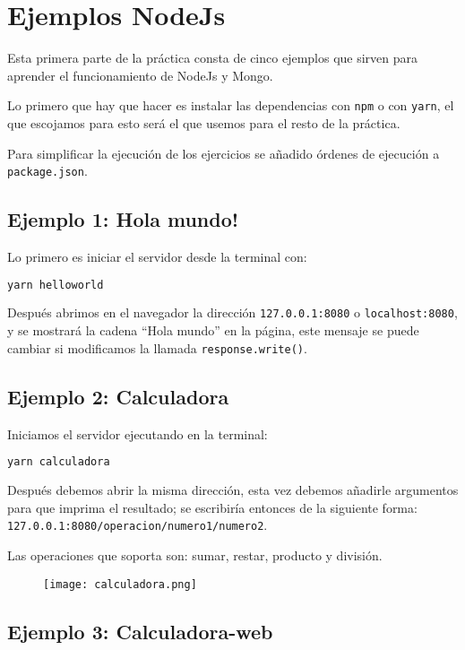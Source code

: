 \chapter{Ejemplos NodeJs}

Esta primera parte de la práctica consta de cinco ejemplos que sirven para aprender
el funcionamiento de NodeJs y Mongo.

Lo primero que hay que hacer es instalar las dependencias con \texttt{npm} o con \texttt{yarn},
el que escojamos para esto será el que usemos para el resto de la práctica.

Para simplificar la ejecución de los ejercicios se añadido órdenes de ejecución a
\texttt{package.json}.

\section{Ejemplo 1: Hola mundo!}
Lo primero es iniciar el servidor desde la terminal con:
\begin{lstlisting}[language=sh]
	yarn helloworld
\end{lstlisting}

Después abrimos en el navegador la dirección \texttt{127.0.0.1:8080} o \texttt{localhost:8080},
y se mostrará la cadena ``Hola mundo'' en la página, este mensaje se puede cambiar si modificamos
la llamada \texttt{response.write()}.

\section{Ejemplo 2: Calculadora}
Iniciamos el servidor ejecutando en la terminal:
\begin{lstlisting}[language=sh]
	yarn calculadora
\end{lstlisting}

Después debemos abrir la misma dirección, esta vez debemos añadirle argumentos para
que imprima el resultado; se escribiría entonces de la siguiente
forma: \texttt{127.0.0.1:8080/operacion/numero1/numero2}.

Las operaciones que soporta son: sumar, restar, producto y división.

\begin{figure}[!ht]
	\begin{center}
		\texttt{[image: calculadora.png]}
	\end{center}
\end{figure}

\section{Ejemplo 3: Calculadora-web}

